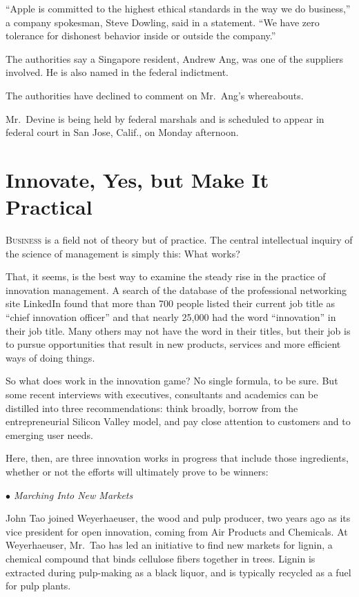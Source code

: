 ﻿\documentclass[12pt]{article}
\begin{document}
``Apple is committed to the highest ethical standards in the way we do business,'' a company
spokesman, Steve Dowling, said in a statement. ``We have zero tolerance for dishonest behavior
inside or outside the company.''

The authorities say a Singapore resident, Andrew Ang, was one of the suppliers involved. He is also
named in the federal indictment.

The authorities have declined to comment on Mr.~Ang's whereabouts.

Mr.~Devine is being held by federal marshals and is scheduled to appear in federal court in San
Jose, Calif., on Monday afternoon.

\section{Innovate, Yes, but Make It Practical}

\lettrine{B}{usiness} is a field not of theory but of practice. The central
intellectual inquiry of the science of management is simply this: What works?

That, it seems, is the best way to examine the steady rise in the practice of innovation management.
A search of the database of the professional networking site LinkedIn found that more than 700
people listed their current job title as ``chief innovation officer'' and that nearly 25,000 had the
word ``innovation'' in their job title. Many others may not have the word in their titles, but their
job is to pursue opportunities that result in new products, services and more efficient ways of
doing things.

So what does work in the innovation game? No single formula, to be sure. But some recent interviews
with executives, consultants and academics can be distilled into three recommendations: think
broadly, borrow from the entrepreneurial Silicon Valley model, and pay close attention to customers
and to emerging user needs.

Here, then, are three innovation works in progress that include those ingredients, whether or not
the efforts will ultimately prove to be winners:

\emph{$\bullet$ Marching Into New Markets}

John Tao joined Weyerhaeuser, the wood and pulp producer, two years ago as its vice president for
open innovation, coming from Air Products and Chemicals. At Weyerhaeuser, Mr.~Tao has led an
initiative to find new markets for lignin, a chemical compound that binds cellulose fibers together
in trees. Lignin is extracted during pulp-making as a black liquor, and is typically recycled as a
fuel for pulp plants.
\end{document}
